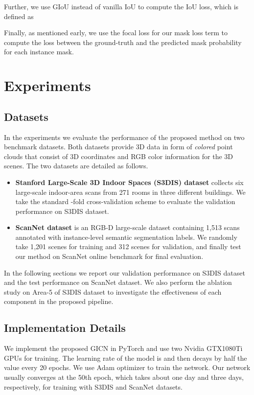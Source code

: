 \documentclass[runningheads]{llncs}
\begin{document}
Further, we use GIoU \cite{rezatofighi2019generalized} instead of vanilla IoU to compute the IoU loss, which is defined as 

Finally, as mentioned early, we use the focal loss for our mask loss term  to compute the loss between the ground-truth and the predicted mask probability for each instance mask. 

\section{Experiments}
\subsection{Datasets}
In the experiments we evaluate the performance of the proposed method on two benchmark datasets. Both datasets provide 3D data in form of {\em colored} point clouds that consist of 3D coordinates and RGB color information for the 3D scenes. The two datasets are detailed as follows. 
\begin{itemize}
  \item \textbf{Stanford Large-Scale 3D Indoor Spaces (S3DIS) dataset} \cite{ArmeniOAHIMS16} collects six large-scale indoor-area scans from 271 rooms in three different buildings. We take the standard -fold cross-validation scheme to evaluate the validation performance on S3DIS dataset.
  \item \textbf{ScanNet dataset} \cite{DaiAMMTMS17} is an RGB-D large-scale dataset containing 1{,}513 scans annotated with instance-level semantic segmentation labels. We randomly take 1{,}201 scenes for training and 312 scenes for validation, and finally test our method on ScanNet online benchmark for final evaluation.
\end{itemize}

In the following sections we report our validation performance on S3DIS dataset and the test performance on ScanNet dataset. We also perform the ablation study on Area-5 of S3DIS dataset to investigate the effectiveness of each component in the proposed pipeline.

\subsection{Implementation Details}
We implement the proposed GICN in PyTorch and use two Nvidia GTX1080Ti GPUs for training. The learning rate of the model is  and then decays by half the value every 20 epochs. We use Adam optimizer to train the network. Our network usually converges at the 50th epoch, which takes about one day and three days, respectively, for training with S3DIS and ScanNet datasets.
\end{document}
